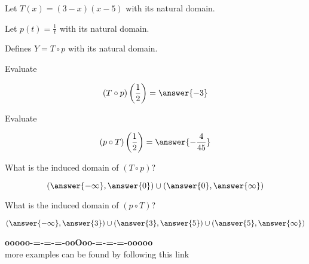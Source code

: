 \documentclass{ximera}
\begin{document}
\begin{example}



Let $T(x) = (3-x)(x-5)$ with its natural domain.


Let $p(t) = \frac{1}{t}$ with its natural domain.


Defines $Y = T \circ p$ with its natural domain.



\begin{question}

Evaluate


\[
(T \circ p)\left( \frac{1}{2} \right) = \answer{-3}
\]



\end{question}






\begin{question}

Evaluate


\[
(p \circ T)\left( \frac{1}{2} \right) = \answer{-\frac{4}{45}}
\]



\end{question}





\begin{question}

What is the induced domain of $(T \circ p)$?


\[
\left( \answer{-\infty}, \answer{0}  \right) \cup \left( \answer{0}, \answer{\infty}  \right)
\]



\end{question}








\begin{question}

What is the induced domain of $(p \circ T)$?


\[
\left( \answer{-\infty}, \answer{3}  \right) \cup \left( \answer{3}, \answer{5}  \right)  \cup \left( \answer{5}, \answer{\infty}  \right)
\]



\end{question}







\end{example}














\begin{center}
\textbf{\textcolor{green!50!black}{ooooo-=-=-=-ooOoo-=-=-=-ooooo}} \\

more examples can be found by following this link\\ 

\end{center}
\end{document}
